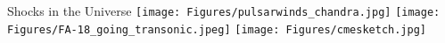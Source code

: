 \documentclass[10pt,aspectratio=169,usenames,dvipsnames]{beamer}
\begin{document}


\begin{frame}{Shocks in the Universe}
\texttt{[image: Figures/pulsarwinds\_chandra.jpg]}
\texttt{[image: Figures/FA-18\_going\_transonic.jpeg]}
\texttt{[image: Figures/cmesketch.jpg]}
\end{frame}
\end{document}
